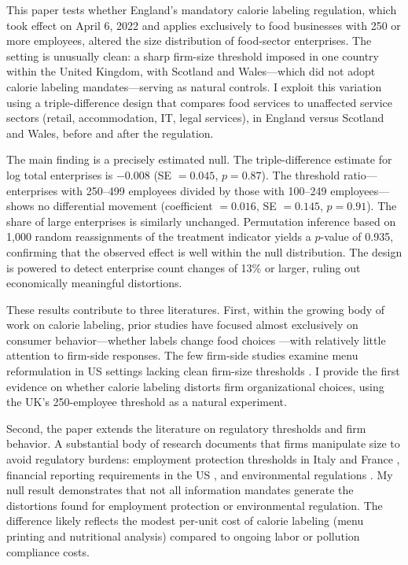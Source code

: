 \documentclass[12pt]{article}
\begin{document}
This paper tests whether England's mandatory calorie labeling regulation, which took effect on April 6, 2022 and applies exclusively to food businesses with 250 or more employees, altered the size distribution of food-sector enterprises. The setting is unusually clean: a sharp firm-size threshold imposed in one country within the United Kingdom, with Scotland and Wales---which did not adopt calorie labeling mandates---serving as natural controls. I exploit this variation using a triple-difference design that compares food services to unaffected service sectors (retail, accommodation, IT, legal services), in England versus Scotland and Wales, before and after the regulation.

The main finding is a precisely estimated null. The triple-difference estimate for log total enterprises is $-0.008$ (SE $= 0.045$, $p = 0.87$). The threshold ratio---enterprises with 250--499 employees divided by those with 100--249 employees---shows no differential movement (coefficient $= 0.016$, SE $= 0.145$, $p = 0.91$). The share of large enterprises is similarly unchanged. Permutation inference based on 1,000 random reassignments of the treatment indicator yields a $p$-value of 0.935, confirming that the observed effect is well within the null distribution. The design is powered to detect enterprise count changes of 13\% or larger, ruling out economically meaningful distortions.

These results contribute to three literatures. First, within the growing body of work on calorie labeling, prior studies have focused almost exclusively on consumer behavior---whether labels change food choices \citep{bollinger2011calorie, wisdom2010ordering, long2015systematic, cawley2018pass}---with relatively little attention to firm-side responses. The few firm-side studies examine menu reformulation in US settings lacking clean firm-size thresholds \citep{bleich2017reducing, bleich2020association}. I provide the first evidence on whether calorie labeling distorts firm organizational choices, using the UK's 250-employee threshold as a natural experiment.

Second, the paper extends the literature on regulatory thresholds and firm behavior. A substantial body of research documents that firms manipulate size to avoid regulatory burdens: employment protection thresholds in Italy and France \citep{garibaldi2004anatomy, ceci2012regulatory}, financial reporting requirements in the US \citep{iliev2010effect}, and environmental regulations \citep{bento2018effect}. My null result demonstrates that not all information mandates generate the distortions found for employment protection or environmental regulation. The difference likely reflects the modest per-unit cost of calorie labeling (menu printing and nutritional analysis) compared to ongoing labor or pollution compliance costs.
\end{document}
